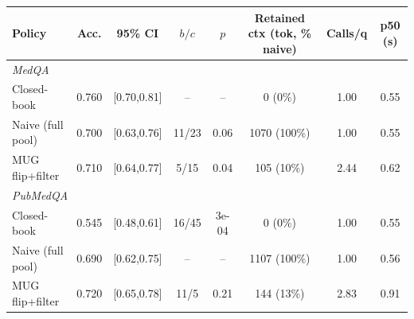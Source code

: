 \begin{tabular}{lccccccc}
\toprule
Policy & Acc. & 95\% CI & $b/c$ & $p$ & Retained ctx (tok, \% naive) & Calls/q & p50 (s) \\
\midrule
\multicolumn{8}{l}{\textit{MedQA}} \\
Closed-book & 0.760 & [0.70,0.81] & -- & -- & 0 (0\%) & 1.00 & 0.55 \\
Naive (full pool) & 0.700 & [0.63,0.76] & 11/23 & 0.06 & 1070 (100\%) & 1.00 & 0.55 \\
MUG flip+filter & 0.710 & [0.64,0.77] & 5/15 & 0.04 & 105 (10\%) & 2.44 & 0.62 \\
\midrule
\multicolumn{8}{l}{\textit{PubMedQA}} \\
Closed-book & 0.545 & [0.48,0.61] & 16/45 & 3e-04 & 0 (0\%) & 1.00 & 0.55 \\
Naive (full pool) & 0.690 & [0.62,0.75] & -- & -- & 1107 (100\%) & 1.00 & 0.56 \\
MUG flip+filter & 0.720 & [0.65,0.78] & 11/5 & 0.21 & 144 (13\%) & 2.83 & 0.91 \\
\bottomrule
\end{tabular}
